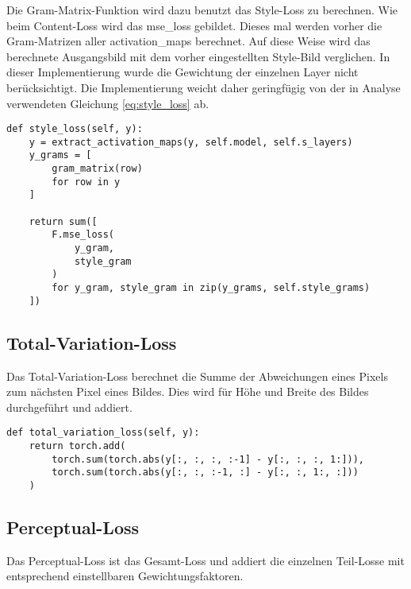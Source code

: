 \pagebreak

Die Gram-Matrix-Funktion wird dazu benutzt das Style-Loss zu berechnen. Wie beim Content-Loss wird das \gls{mse_loss} gebildet. Dieses mal werden vorher die Gram-Matrizen aller \gls{activation_map}s berechnet. Auf diese Weise wird das berechnete Ausgangsbild mit dem vorher eingestellten Style-Bild verglichen.
In dieser Implementierung wurde die Gewichtung der einzelnen Layer nicht berücksichtigt. Die Implementierung weicht daher geringfügig von der in Analyse verwendeten Gleichung \eqref{eq:style_loss} ab.

\begin{listing}[H]
\begin{verbatim}
def style_loss(self, y):
    y = extract_activation_maps(y, self.model, self.s_layers)
    y_grams = [
        gram_matrix(row)
        for row in y
    ]

    return sum([
        F.mse_loss(
            y_gram,
            style_gram
        )
        for y_gram, style_gram in zip(y_grams, self.style_grams)
    ])
\end{verbatim}
\end{listing}

\subsection{Total-Variation-Loss}

Das Total-Variation-Loss berechnet die Summe der Abweichungen eines Pixels zum nächsten Pixel eines Bildes. Dies wird für Höhe und Breite des Bildes durchgeführt und addiert.

\begin{listing}[H]
\begin{verbatim}
def total_variation_loss(self, y):
    return torch.add(
        torch.sum(torch.abs(y[:, :, :, :-1] - y[:, :, :, 1:])),
        torch.sum(torch.abs(y[:, :, :-1, :] - y[:, :, 1:, :]))
    )
\end{verbatim}
\end{listing}

\subsection{Perceptual-Loss}

Das Perceptual-Loss ist das Gesamt-Loss und addiert die einzelnen Teil-Losse mit entsprechend einstellbaren Gewichtungsfaktoren.

